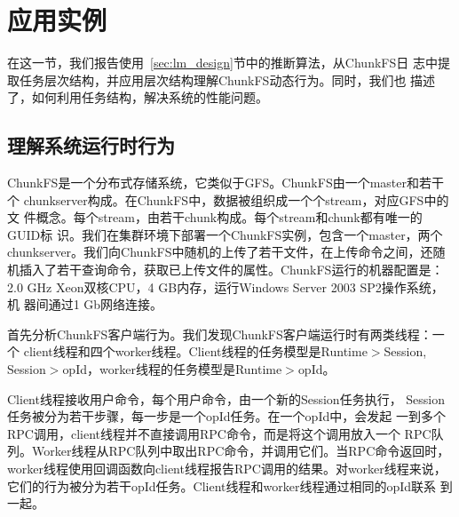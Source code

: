 

\section{应用实例}
\label{sec:lm_case}





在这一节，我们报告使用~\ref{sec:lm_design}节中的推断算法，从ChunkFS日
志中提取任务层次结构，并应用层次结构理解ChunkFS动态行为。同时，我们也
描述了，如何利用任务结构，解决系统的性能问题。

\subsection{理解系统运行时行为}

ChunkFS是一个分布式存储系统，它类似于GFS。ChunkFS由一个master和若干个
chunkserver构成。在ChunkFS中，数据被组织成一个个stream，对应GFS中的文
件概念。每个stream，由若干chunk构成。每个stream和chunk都有唯一的GUID标
识。我们在集群环境下部署一个ChunkFS实例，包含一个master，两个
chunkserver。我们向ChunkFS中随机的上传了若干文件，在上传命令之间，还随
机插入了若干查询命令，获取已上传文件的属性。ChunkFS运行的机器配置是：
2.0 GHz Xeon双核CPU，4 GB内存，运行Windows Server 2003 SP2操作系统，机
器间通过1 Gb网络连接。


首先分析ChunkFS客户端行为。我们发现ChunkFS客户端运行时有两类线程：一个
client线程和四个worker线程。Client线程的任务模型是Runtime$>$Session,
Session$>$opId，worker线程的任务模型是Runtime$>$opId。

Client线程接收用户命令，每个用户命令，由一个新的Session任务执行，
Session任务被分为若干步骤，每一步是一个opId任务。在一个opId中，会发起
一到多个RPC调用，client线程并不直接调用RPC命令，而是将这个调用放入一个
RPC队列。Worker线程从RPC队列中取出RPC命令，并调用它们。当RPC命令返回时，
worker线程使用回调函数向client线程报告RPC调用的结果。对worker线程来说，
它们的行为被分为若干opId任务。Client线程和worker线程通过相同的opId联系
到一起。

